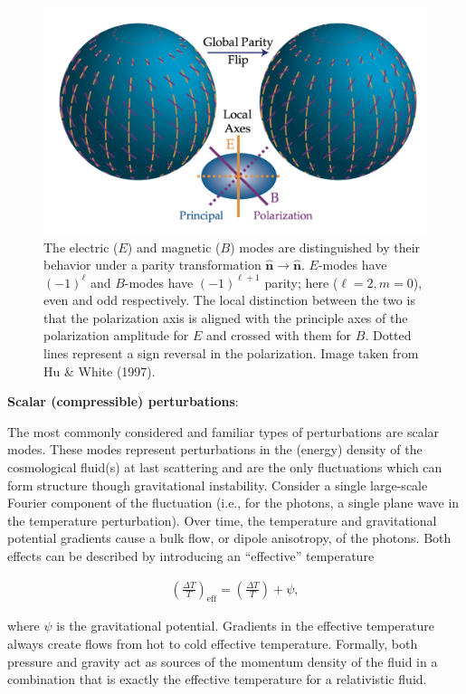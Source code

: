 \documentclass[a4paper,11pt]{article}
\begin{document}
\begin{figure}[h]
    \includegraphics[width=16cm]{figures/EBmodes.png}
    \centering
    \caption{\footnotesize{The electric ($E$) and magnetic ($B$) modes are distinguished by their behavior under a parity transformation $\bm{\hat{n}}\rightarrow\bm{\hat{n}}$. $E$-modes have $(-1)^\ell$ and $B$-modes have $(-1)^{\ell+1}$ parity; here ($\ell=2,m=0$), even and odd respectively. The local distinction between the two is that the polarization axis is aligned with the principle axes of the polarization amplitude for $E$ and crossed with them for $B$. Dotted lines represent a sign reversal in the polarization. Image taken from Hu \& White (1997).}}
    \label{fig:ebmodes}
\end{figure}

{\noindent}\textbf{Scalar (compressible) perturbations}:

{\noindent}The most commonly considered and familiar types of perturbations are scalar modes. These modes represent perturbations in the (energy) density of the cosmological fluid(s) at last scattering and are the only fluctuations which can form structure though gravitational instability. Consider a single large-scale Fourier component of the fluctuation (i.e., for the photons, a single plane wave in the temperature perturbation). Over time, the temperature and gravitational potential gradients cause a bulk flow, or dipole anisotropy, of the photons. Both effects can be described by introducing an “effective” temperature

\begin{align*}
    \left(\frac{\Delta T}{T}\right)_\mathrm{eff} = \left(\frac{\Delta T}{T}\right) + \psi,
\end{align*}

{\noindent}where $\psi$ is the gravitational potential. Gradients in the effective temperature always create flows from hot to cold effective temperature. Formally, both pressure and gravity act as sources of the momentum density of the fluid in a combination that is exactly the effective temperature for a relativistic fluid.
\end{document}
